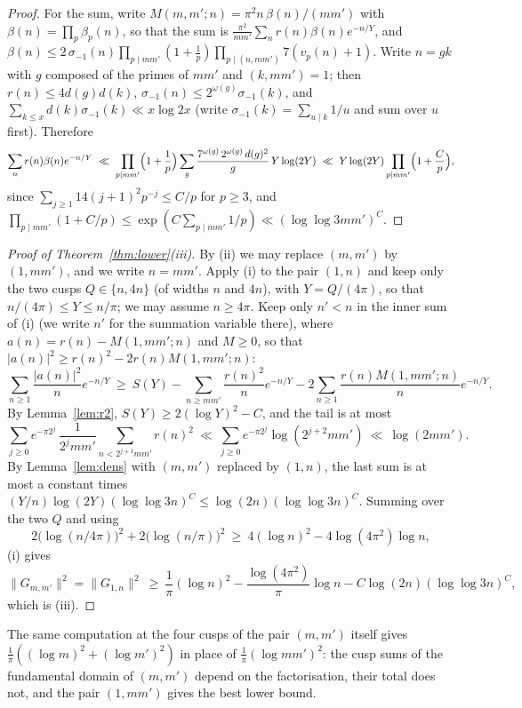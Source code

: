 ﻿\documentclass[11pt]{amsart}
\theoremstyle{remark}
\begin{document}
\begin{proof}
For the sum, write $M(m,m';n)=\pi^2n\,\beta(n)/(mm')$ with $\beta(n)=\prod_p\beta_p(n)$, so that the sum is $\frac{\pi^2}{mm'}\sum_nr(n)\beta(n)e^{-n/Y}$, and $\beta(n)\le2\,\sigma_{-1}(n)\prod_{p\mid mm'}(1+\tfrac1p)\prod_{p\mid(n,mm')}7(v_p(n)+1)$. Write $n=gk$ with $g$ composed of the primes of $mm'$ and $(k,mm')=1$; then $r(n)\le4d(g)d(k)$, $\sigma_{-1}(n)\le2^{\omega(g)}\sigma_{-1}(k)$, and $\sum_{k\le x}d(k)\sigma_{-1}(k)\ll x\log2x$ (write $\sigma_{-1}(k)=\sum_{u\mid k}1/u$ and sum over $u$ first). Therefore
\[
\sum_nr(n)\beta(n)e^{-n/Y}\ \ll\ \prod_{p\mid mm'}\Bigl(1+\frac1p\Bigr)\sum_g\frac{7^{\omega(g)}\,2^{\omega(g)}\,d(g)^2}{g}\,Y\log(2Y)\ \ll\ Y\log(2Y)\prod_{p\mid mm'}\Bigl(1+\frac{C}p\Bigr),
\]
since $\sum_{j\ge1}14(j+1)^2p^{-j}\le C/p$ for $p\ge3$, and $\prod_{p\mid mm'}(1+C/p)\le\exp(C\sum_{p\mid mm'}1/p)\ll(\log\log3mm')^{C}$.
\end{proof}

\begin{proof}[Proof of Theorem~\ref{thm:lower}(iii)]
By (ii) we may replace $(m,m')$ by $(1,mm')$, and we write $n=mm'$. Apply (i) to the pair $(1,n)$ and keep only the two cusps $Q\in\{n,4n\}$ (of widths $n$ and $4n$), with $Y=Q/(4\pi)$, so that $n/(4\pi)\le Y\le n/\pi$; we may assume $n\ge4\pi$. Keep only $n'<n$ in the inner sum of (i) (we write $n'$ for the summation variable there), where $a(n)=r(n)-M(1,mm';n)$ and $M\ge0$, so that $|a(n)|^2\ge r(n)^2-2r(n)M(1,mm';n)$:
\[
\sum_{n\ge1}\frac{|a(n)|^2}{n}e^{-n/Y}\ \ge\ S(Y)-\sum_{n\ge mm'}\frac{r(n)^2}{n}e^{-n/Y}-2\sum_{n\ge1}\frac{r(n)M(1,mm';n)}{n}e^{-n/Y}.
\]
By Lemma~\ref{lem:r2}, $S(Y)\ge2(\log Y)^2-C$, and the tail is at most
\[
\sum_{j\ge0}e^{-\pi2^j}\,\frac1{2^jmm'}\sum_{n<2^{j+1}mm'}r(n)^2\ \ll\ \sum_{j\ge0}e^{-\pi2^j}\log(2^{j+2}mm')\ \ll\ \log(2mm').
\]
By Lemma~\ref{lem:dens} with $(m,m')$ replaced by $(1,n)$, the last sum is at most a constant times $(Y/n)\log(2Y)(\log\log3n)^C\le\log(2n)(\log\log3n)^C$. Summing over the two $Q$ and using
\[
2\bigl(\log(n/4\pi)\bigr)^2+2\bigl(\log(n/\pi)\bigr)^2\ \ge\ 4(\log n)^2-4\log(4\pi^2)\log n,
\]
(i) gives
\[
\|G_{m,m'}\|^2=\|G_{1,n}\|^2\ \ge\ \frac1{\pi}(\log n)^2-\frac{\log(4\pi^2)}\pi\log n-C\log(2n)(\log\log3n)^C,
\]
which is (iii).
\end{proof}

The same computation at the four cusps of the pair $(m,m')$ itself gives $\frac1\pi((\log m)^2+(\log m')^2)$ in place of $\frac1\pi(\log mm')^2$: the cusp sums of the fundamental domain of $(m,m')$ depend on the factorisation, their total does not, and the pair $(1,mm')$ gives the best lower bound.
\end{document}
